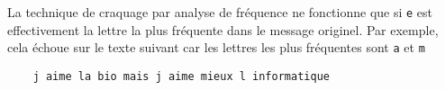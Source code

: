 \quessques \inputminted{python}{minted/exams/caractere_le_plus_frequent_correction.py}
\ssques \inputminted{python}{minted/exams/devine_k_correction.py}

\quessques \inputminted{python}{minted/exams/craque_code_cesar_correction.py}
\ssques La technique de craquage par analyse de fréquence ne fonctionne que si \texttt{e} est effectivement la lettre la plus fréquente dans le message originel. Par exemple, cela échoue sur le texte suivant car les lettres les plus fréquentes sont \texttt{a} et \texttt{m}
\begin{verbatim}
    j aime la bio mais j aime mieux l informatique
\end{verbatim}

